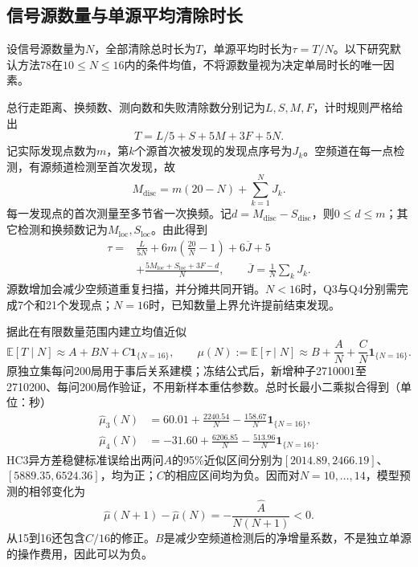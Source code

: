 \subsection{信号源数量与单源平均清除时长}
设信号源数量为$N$，全部清除总时长为$T$，单源平均时长为$\tau=T/N$。以下研究默认方法78在$10\le N\le16$内的条件均值，不将源数量视为决定单局时长的唯一因素。

总行走距离、换频数、测向数和失败清除数分别记为$L,S,M,F$，计时规则严格给出
\begin{equation}T=L/5+S+5M+3F+5N.\end{equation}
记实际发现点数为$m$，第$k$个源首次被发现的发现点序号为$J_k$。空频道在每一点检测，有源频道检测至首次发现，故
\begin{equation}M_{\mathrm{disc}}=m(20-N)+\sum_{k=1}^N J_k.\end{equation}
每一发现点的首次测量至多节省一次换频。记$d=M_{\mathrm{disc}}-S_{\mathrm{disc}}$，则$0\le d\le m$；其它检测和换频数记为$M_{\mathrm{loc}},S_{\mathrm{loc}}$。由此得到
\begin{equation}\begin{aligned}
\tau={}&\frac{L}{5N}+6m\left(\frac{20}{N}-1\right)+6\overline J+5\\
&+\frac{5M_{\mathrm{loc}}+S_{\mathrm{loc}}+3F-d}{N},\qquad \overline J=\frac1N\sum_kJ_k.
\end{aligned}\end{equation}
源数增加会减少空频道重复扫描，并分摊共同开销。$N<16$时，Q3与Q4分别需完成7个和21个发现点；$N=16$时，已知数量上界允许提前结束发现。

据此在有限数量范围内建立均值近似
\begin{equation}
\mathbb E[T\mid N]\approx A+BN+C\mathbf1_{\{N=16\}},\qquad
\mu(N):=\mathbb E[\tau\mid N]\approx B+\frac A N+\frac C N\mathbf1_{\{N=16\}}.
\end{equation}
原独立集每问200局用于事后关系建模；冻结公式后，新增种子2710001至2710200、每问200局作验证，不用新样本重估参数。总时长最小二乘拟合得到（单位：秒）
\begin{align}
\widehat\mu_3(N)&=60.01+\frac{2240.54}{N}-\frac{158.67}{N}\mathbf1_{\{N=16\}},\\
\widehat\mu_4(N)&=-31.60+\frac{6206.85}{N}-\frac{513.96}{N}\mathbf1_{\{N=16\}}.
\end{align}
HC3异方差稳健标准误给出两问$A$的95\%近似区间分别为$[2014.89,2466.19]$、$[5889.35,6524.36]$，均为正；$C$的相应区间均为负。因而对$N=10,\ldots,14$，模型预测的相邻变化为
\begin{equation}\widehat\mu(N+1)-\widehat\mu(N)=-\frac{\widehat A}{N(N+1)}<0.\end{equation}
从15到16还包含$\widehat C/16$的修正。$B$是减少空频道检测后的净增量系数，不是独立单源的操作费用，因此可以为负。

